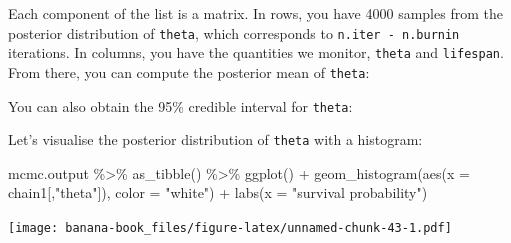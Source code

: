 \documentclass[
  12pt,
]{krantz}
\newenvironment{Shaded}{\begin{snugshade}}{\end{snugshade}}
\newcommand{\AttributeTok}[1]{\textcolor[rgb]{0.77,0.63,0.00}{#1}}
\newcommand{\DecValTok}[1]{\textcolor[rgb]{0.00,0.00,0.81}{#1}}
\newcommand{\DocumentationTok}[1]{\textcolor[rgb]{0.56,0.35,0.01}{\textbf{\textit{#1}}}}
\newcommand{\FloatTok}[1]{\textcolor[rgb]{0.00,0.00,0.81}{#1}}
\newcommand{\FunctionTok}[1]{\textcolor[rgb]{0.00,0.00,0.00}{#1}}
\newcommand{\NormalTok}[1]{#1}
\newcommand{\SpecialCharTok}[1]{\textcolor[rgb]{0.00,0.00,0.00}{#1}}
\newcommand{\StringTok}[1]{\textcolor[rgb]{0.31,0.60,0.02}{#1}}
\begin{document}
Each component of the list is a matrix. In rows, you have 4000 samples from the posterior distribution of \texttt{theta}, which corresponds to \texttt{n.iter\ -\ n.burnin} iterations. In columns, you have the quantities we monitor, \texttt{theta} and \texttt{lifespan}. From there, you can compute the posterior mean of \texttt{theta}:

\begin{Shaded}
\end{Shaded}

You can also obtain the 95\% credible interval for \texttt{theta}:

\begin{Shaded}
\end{Shaded}

Let's visualise the posterior distribution of \texttt{theta} with a histogram:

\begin{Shaded}
\begin{Highlighting}[]
\NormalTok{mcmc.output }\SpecialCharTok{\%\textgreater{}\%}
  \FunctionTok{as\_tibble}\NormalTok{() }\SpecialCharTok{\%\textgreater{}\%}
  \FunctionTok{ggplot}\NormalTok{() }\SpecialCharTok{+}
  \FunctionTok{geom\_histogram}\NormalTok{(}\FunctionTok{aes}\NormalTok{(}\AttributeTok{x =}\NormalTok{ chain1[,}\StringTok{"theta"}\NormalTok{]), }\AttributeTok{color =} \StringTok{"white"}\NormalTok{) }\SpecialCharTok{+}
  \FunctionTok{labs}\NormalTok{(}\AttributeTok{x =} \StringTok{"survival probability"}\NormalTok{)}
\end{Highlighting}
\end{Shaded}

\texttt{[image: banana-book\_files/figure-latex/unnamed-chunk-43-1.pdf]}
\end{document}
